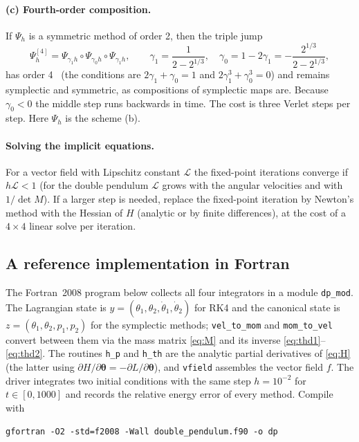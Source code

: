 \documentclass[11pt,a4paper]{book}
\theoremstyle{definition}
\theoremstyle{remark}
\begin{document}
\paragraph{(c) Fourth-order composition.} If $\Psi_h$ is a symmetric method of order 2, then the triple jump
\begin{equation}
  \Psi^{[4]}_h=\Psi_{\gamma_1h}\circ\Psi_{\gamma_0h}\circ\Psi_{\gamma_1h},\qquad
  \gamma_1=\frac1{2-2^{1/3}},\quad\gamma_0=1-2\gamma_1=-\frac{2^{1/3}}{2-2^{1/3}},
\end{equation}
has order 4~\cite{yoshida} (the conditions are $2\gamma_1+\gamma_0=1$ and $2\gamma_1^3+\gamma_0^3=0$) and remains
symplectic and symmetric, as compositions of symplectic maps are. Because $\gamma_0<0$ the middle step runs backwards
in time. The cost is three Verlet steps per step. Here $\Psi_h$ is the scheme (b).

\paragraph{Solving the implicit equations.} For a vector field with Lipschitz constant $\mathcal L$ the fixed-point
iterations converge if $h\mathcal L<1$ (for the double pendulum $\mathcal L$ grows with the angular velocities and
with $1/\det M$). If a larger step is needed, replace the fixed-point iteration by Newton's method with the Hessian
of $H$ (analytic or by finite differences), at the cost of a $4\times4$ linear solve per iteration.

\subsection{A reference implementation in Fortran}
\label{sec:fortran}

The Fortran~2008 program below collects all four integrators in a module \texttt{dp\_mod}. The Lagrangian state is
$y=(\theta_1,\theta_2,\dot\theta_1,\dot\theta_2)$ for RK4 and the canonical state is
$z=(\theta_1,\theta_2,p_1,p_2)$ for the symplectic methods; \texttt{vel\_to\_mom} and \texttt{mom\_to\_vel} convert
between them via the mass matrix \eqref{eq:M} and its inverse \eqref{eq:thd1}--\eqref{eq:thd2}. The routines
\texttt{h\_p} and \texttt{h\_th} are the analytic partial derivatives of \eqref{eq:H} (the latter using
$\partial H/\partial\bm\theta=-\partial L/\partial\bm\theta$), and \texttt{vfield} assembles the vector field $f$.
The driver integrates two initial conditions with the same step $h=10^{-2}$ for $t\in[0,1000]$ and records the
relative energy error of every method. Compile with
\begin{center}
\texttt{gfortran -O2 -std=f2008 -Wall double\_pendulum.f90 -o dp}
\end{center}
\end{document}

